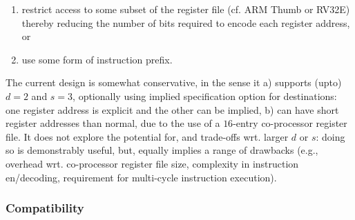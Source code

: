 \begin{itemize}
      \begin{enumerate}
      \item restrict access to some subset of the register file 
            (cf. ARM Thumb or RV32E) 
            thereby reducing the number of bits required to encode each  
            register address,
            or
      \item use some form of instruction prefix.
      \end{enumerate}
      
      \noindent
      The current design is somewhat conservative, in the sense it 
      a) supports (upto) $d = 2$ and $s = 3$, 
         optionally using implied specification option for destinations: 
         one register address is explicit and the other can be implied,
      b) can have short register addresses than normal, due to the use
         of a $16$-entry co-processor register file.
      It does not explore the potential for, and trade-offs wrt. larger 
      $d$ or $s$: doing so is demonstrably useful, but, equally implies
      a range of drawbacks (e.g., overhead wrt. co-processor register 
      file size, complexity in instruction en/decoding, requirement for
      multi-cycle instruction execution).

\end{itemize}


\subsubsection{Compatibility}

